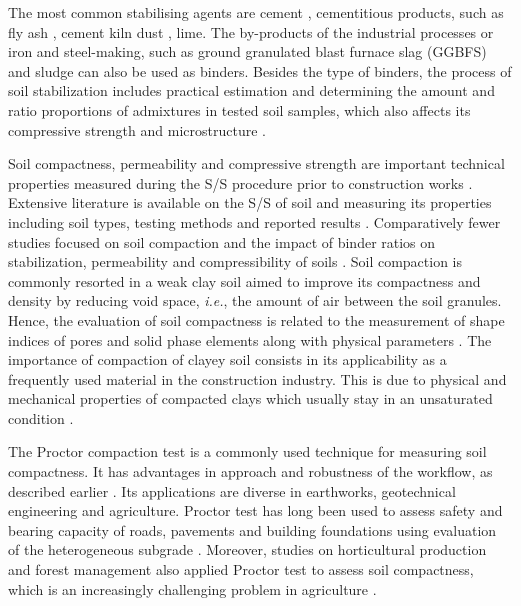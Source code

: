 \documentclass{amestyle}
\begin{document}
The most common stabilising agents are cement \cite{Rekik}, cementitious products, such as fly ash \cite{Tastan,Hasan}, cement kiln dust \cite{Solanki,Lindh2021a}, lime. The by-products of the industrial processes or iron and steel-making, such as ground granulated blast furnace slag (GGBFS) \cite{Mozejko} and sludge \cite{Ingunza,Sharif} can also be used as binders. Besides the type of binders, the process of soil stabilization includes practical estimation and determining the amount and ratio proportions of admixtures in tested soil samples, which also affects its compressive strength and microstructure \cite{Lindh2001,Ahmed}.

Soil compactness, permeability and compressive strength are important technical properties measured during the S/S procedure prior to construction works \cite{LindhWinter,XU2021114774}. Extensive literature is available on the S/S of soil and measuring its properties including soil types, testing methods and reported results \cite{Anagnostopoulos,Kallenetal2016,Lemenkov2021a,HUANG2022115452}. Comparatively fewer studies focused on soil compaction and the impact of binder ratios on stabilization, permeability and compressibility of soils \cite{Kongkitkul,Leeetal2007}. Soil compaction is commonly resorted in a weak clay soil aimed to improve its compactness and density by reducing void space, \emph{i.e.}, the amount of air between the soil granules. Hence, the evaluation of soil compactness is related to the measurement of shape indices of pores and solid phase elements along with physical parameters \cite{Bryk}. The importance of compaction of clayey soil consists in its applicability as a frequently used material in the construction industry. This is due to physical and mechanical properties of compacted clays which usually stay in an unsaturated condition \cite{Zou}. 

The Proctor compaction test is a commonly used technique for measuring soil compactness. It has advantages in approach and robustness of the workflow, as described earlier \cite{Wasman,Matteo,Boudlal}. Its applications are diverse in earthworks, geotechnical engineering and agriculture. Proctor test has long been used to assess safety and bearing capacity of roads, pavements and building foundations using evaluation of the heterogeneous subgrade \cite{Barden,Jibon}. Moreover, studies on horticultural production and forest management also applied Proctor test to assess soil compactness, which is an increasingly challenging problem in agriculture \cite{ARAGON2000197,Bayat,Nhantumbo,ALAOUI20111}. 
\end{document}
